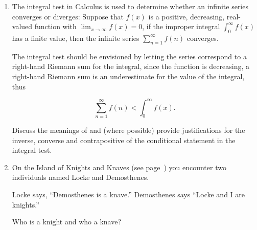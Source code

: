 \begin{enumerate}
\item The integral test in Calculus is used to determine whether an
infinite series converges or diverges:   Suppose that $f(x)$ is a positive,
decreasing, 
real-valued function with $\lim_{x \longrightarrow \infty} f(x) = 0$, if
the improper integral
$\int_0^\infty f(x)$ has a finite value, then the infinite series 
$\sum_{n=1}^\infty f(n)$ converges.

The integral test should be envisioned by letting the series correspond
to a right-hand Riemann sum for the integral, since the function is decreasing,
a right-hand Riemann sum is an underestimate for the value of the integral,
thus

\[ \sum_{n=1}^\infty f(n) < \int_0^\infty f(x). \]

Discuss the meanings of and (where possible) provide justifications for
the inverse, converse and contrapositive of the conditional statement 
in the integral test.

\item On the Island of Knights and Knaves (see page~\pageref{IKK}) you encounter two individuals named Locke and Demosthenes.  

Locke says, ``Demosthenes is a knave.'' \newline
Demosthenes says ``Locke and I are knights.''

Who is a knight and who a knave?

\end{enumerate}
